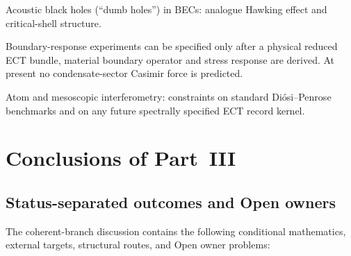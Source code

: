 \documentclass[11pt,a4paper]{article}
\begin{document}
Acoustic black holes (``dumb holes'') in BECs: analogue Hawking effect and critical-shell structure.

Boundary-response experiments can be specified only after a physical reduced ECT bundle, material boundary operator and stress response are derived.  At present no condensate-sector Casimir force is predicted.

Atom and mesoscopic interferometry: constraints on standard Di\'osi--Penrose benchmarks and on any future spectrally specified ECT record kernel.


\section{Conclusions of Part~III}

\subsection{Status-separated outcomes and Open owners}

The coherent-branch discussion contains the following conditional
mathematics, external targets, structural routes, and Open owner problems:
\end{document}
